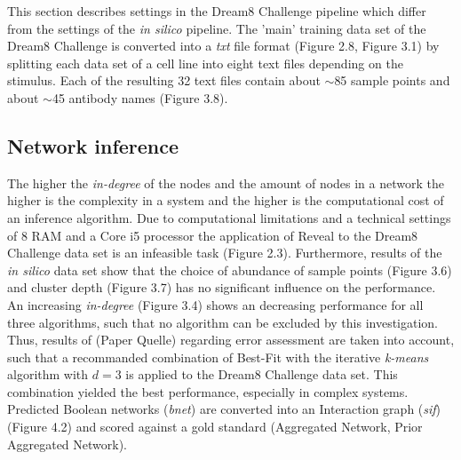This section describes settings in the Dream8 Challenge pipeline which differ from the settings of the \textit{in silico} pipeline. 
The 'main' training data set of the Dream8 Challenge is converted into a \textit{txt} file format (Figure 2.8, Figure 3.1) by splitting each data set of a cell line into eight text files depending on the stimulus. Each of the resulting 32 text files contain about $\sim $85 sample points and about $\sim $45 antibody names (Figure 3.8).\\

\subsection*{Network inference}
The higher the \textit{in-degree} of the nodes and the amount of nodes in a network the higher is the complexity in a system and the higher is the computational cost of an inference algorithm. Due to computational limitations and a technical settings of 8 RAM and a Core i5 processor the application of Reveal to the Dream8 Challenge data set is an infeasible task (Figure 2.3). 
Furthermore, results of the \textit{in silico} data set show that the choice of abundance of sample points (Figure 3.6) and cluster depth (Figure 3.7) has no significant influence on the performance. An increasing \textit{in-degree} (Figure 3.4) shows an decreasing performance for all three algorithms, such that no algorithm can be excluded by this investigation. Thus, results of (Paper Quelle) regarding error assessment are taken into account, such that a recommanded combination of Best-Fit with the iterative \textit{k-means} algorithm with $d=3$ is applied to the Dream8 Challenge data set. This combination yielded the best performance, especially in complex systems.\\
Predicted Boolean networks (\textit{bnet}) are converted into an Interaction graph (\textit{sif}) (Figure 4.2) and scored against a gold standard (Aggregated Network, Prior Aggregated Network). 

